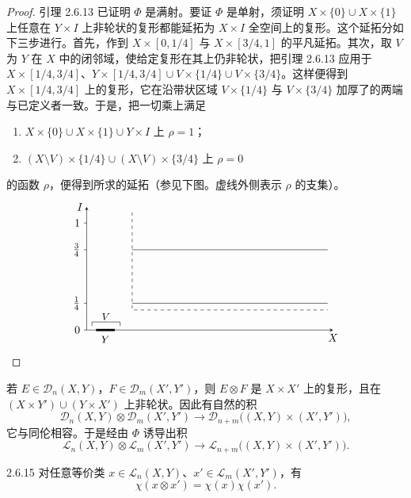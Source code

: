 \begin{proof}
  引理 2.6.13 已证明 $\Phi$ 是满射。要证 $\Phi$ 是单射，须证明 $X\times\{0\}\cup X\times\{1\}$ 上任意在 $Y\times I$ 上非轮状的复形都能延拓为 $X\times I$ 全空间上的复形。这个延拓分如下三步进行。首先，作到 $X\times[0,1/4]$ 与 $X\times[3/4,1]$ 的平凡延拓。其次，取 $V$ 为 $Y$ 在 $X$ 中的闭邻域，使给定复形在其上仍非轮状，把引理 2.6.13 应用于 $X\times[1/4,3/4]$、$Y\times[1/4,3/4]\cup V\times\{1/4\}\cup V\times\{3/4\}$。这样便得到 $X\times[1/4,3/4]$ 上的复形，它在沿带状区域 $V\times\{1/4\}$ 与 $V\times\{3/4\}$ 加厚了的两端与已定义者一致。于是，把一切乘上满足
  \begin{enumerate}[label=(\roman*),leftmargin=2.6em,itemsep=1pt]
  \item $X\times\{0\}\cup X\times\{1\}\cup Y\times I$ 上 $\rho=1$；
  \item $(X\setminus V)\times\{1/4\}\cup(X\setminus V)\times\{3/4\}$ 上 $\rho=0$
  \end{enumerate}
  的函数 $\rho$，便得到所求的延拓（参见下图。虚线外侧表示 $\rho$ 的支集）。
  \[
  \begin{tikzpicture}[baseline=(current bounding box.center),>=stealth,scale=0.85]
    \draw[->] (0,0) -- (9.2,0) node[below] {$X$};
    \draw[->] (0,0) -- (0,4.6) node[left] {$I$};
    \draw (0,0) -- (-0.1,0) node[left] {$0$};
    \draw (0,1) -- (-0.1,1) node[left] {$\tfrac14$};
    \draw (0,3) -- (-0.1,3) node[left] {$\tfrac34$};
    \draw (0,4) -- (-0.1,4) node[left] {$1$};
    \draw[line width=2pt] (0.35,0) -- (1.05,0);
    \node at (0.7,-0.35) {\small $Y$};
    \draw (0.2,0.15) -- (0.2,0.3) -- (1.25,0.3) -- (1.25,0.15);
    \node at (0.72,0.5) {\small $V$};
    \draw (1.7,1) -- (9,1);
    \draw (1.7,3) -- (9,3);
    \draw[dashed] (1.7,4.4) -- (1.7,0.75) -- (9,0.75);
  \end{tikzpicture}
  \]
\end{proof}

若 $E\in\mathcal{D}_n(X,Y)$，$F\in\mathcal{D}_m(X',Y')$，则 $E\otimes F$ 是 $X\times X'$ 上的复形，且在 $(X\times Y')\cup(Y\times X')$ 上非轮状。因此有自然的积
\[
\mathcal{D}_n(X,Y)\otimes\mathcal{D}_m(X',Y')\longrightarrow\mathcal{D}_{n+m}\bigl((X,Y)\times(X',Y')\bigr),
\]
它与同伦相容。于是经由 $\Phi$ 诱导出积
\[
\mathcal{L}_n(X,Y)\otimes\mathcal{L}_m(X',Y')\longrightarrow\mathcal{L}_{n+m}\bigl((X,Y)\times(X',Y')\bigr).
\]

\begin{lemma*}{2.6.15}
  对任意等价类 $x\in\mathcal{L}_n(X,Y)$、$x'\in\mathcal{L}_m(X',Y')$，有
  \[
  \chi(x\otimes x')=\chi(x)\chi(x').
  \]
\end{lemma*}

